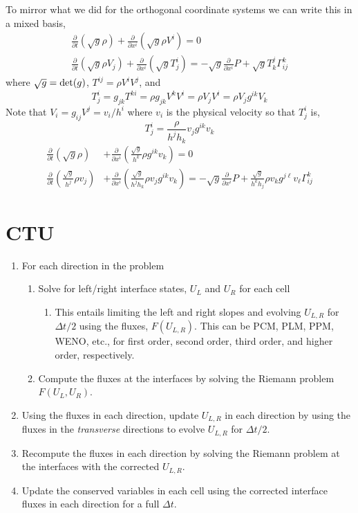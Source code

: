 \documentclass{article}
\newcommand{\pderiv}[1]{\frac{\partial }{\partial #1}}
\begin{document}
To mirror what we did for the orthogonal coordinate systems we can write this in a mixed basis,
\begin{align}
\pderiv{t} (\sqrt{g} \rho ) + \pderiv{x^i} \left( \sqrt{g} \rho V^i\right) = 0 \\
\pderiv{t} ( \sqrt{g} \rho V_j)  + \pderiv{x^i} \left( \sqrt{g} T_j^i  \right) = -\sqrt{g} \pderiv{x^i} P + \sqrt{g} T_k^j \Gamma_{ij}^k
\end{align}
where $\sqrt{g} = {\rm det}(g)$,  $T^{ij} = \rho V^i V^j$, and 
\begin{equation}
	T_j^i = g_{jk} T^{ki} = \rho g_{jk} V^k V^i = \rho V_j V^i = \rho V_j g^{ik} V_k
\end{equation}
Note that $V_i = g_{ij} V^j = v_i /h^i $ where $v_i$ is the physical velocity so that $T_j^i$ is,
\begin{equation}
T_j^i = \frac{\rho}{h^j h_k} v_j g^{ik} v_k 
\end{equation}
\begin{align}
\pderiv{t} (\sqrt{g} \rho ) &+ \pderiv{x^i} \left( \frac{\sqrt{g}}{h^k} \rho g^{ik} v_k \right) = 0 \\
\pderiv{t} ( \frac{\sqrt{g}}{h^j} \rho v_j)  &+ \pderiv{x^i} \left( \frac{\sqrt{g}}{h^j h_k} \rho v_j g^{ik} v_k \right) = - \sqrt{g}\pderiv{x^i} P + \frac{\sqrt{g}}{h^k h_j} \rho v_k  g^{j \ell} v_\ell \Gamma_{ij}^k 
\end{align}




\section{CTU}
\begin{enumerate}
\item For each direction in the problem
\begin{enumerate}
    \item Solve for left/right interface states, $U_L$ and $U_R$ for each cell
    \begin{enumerate}
    	\item This entails limiting the left and right slopes and evolving $U_{L,R}$ for $\Delta t/2$ using the fluxes, $F(U_{L,R})$. This can be PCM, PLM, PPM, WENO, etc., for first order, second order, third order, and higher order, respectively.
    \end{enumerate}
    \item Compute the fluxes at the interfaces by solving the Riemann problem $F(U_L,U_R)$.
\end{enumerate}
\item Using the fluxes in each direction, update $U_{L,R}$ in each direction by using the fluxes in the \emph{transverse} directions to evolve $U_{L,R}$ for $\Delta t/2$. 

\item Recompute the fluxes in each direction by solving the Riemann problem at the interfaces with the corrected $U_{L,R}$. 
\item Update the conserved variables in each cell using the corrected interface fluxes in each direction for a full $\Delta t$.
\end{enumerate}
\end{document}
